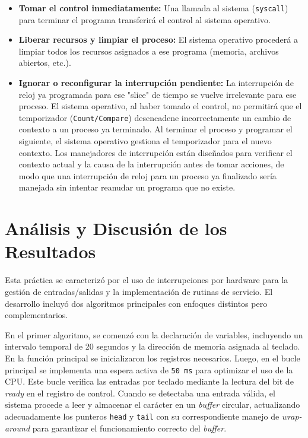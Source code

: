 \documentclass{article}
\begin{document}
\begin{itemize}
    \item \textbf{Tomar el control inmediatamente:} Una llamada al sistema (\texttt{syscall}) para terminar el programa transferirá el control al sistema operativo.
    
    \item \textbf{Liberar recursos y limpiar el proceso:} El sistema operativo procederá a limpiar todos los recursos asignados a ese programa (memoria, archivos abiertos, etc.).
    
    \item \textbf{Ignorar o reconfigurar la interrupción pendiente:} La interrupción de reloj ya programada para ese "slice" de tiempo se vuelve irrelevante para ese proceso. El sistema operativo, al haber tomado el control, no permitirá que el temporizador (\texttt{Count/Compare}) desencadene incorrectamente un cambio de contexto a un proceso ya terminado. Al terminar el proceso y programar el siguiente, el sistema operativo gestiona el temporizador para el nuevo contexto. Los manejadores de interrupción están diseñados para verificar el contexto actual y la causa de la interrupción antes de tomar acciones, de modo que una interrupción de reloj para un proceso ya finalizado sería manejada sin intentar reanudar un programa que no existe.
\end{itemize}

\section{Análisis y Discusión de los Resultados}

Esta práctica se caracterizó por el uso de interrupciones por hardware para la gestión de entradas/salidas y la implementación de rutinas de servicio. El desarrollo incluyó dos algoritmos principales con enfoques distintos pero complementarios.

En el primer algoritmo, se comenzó con la declaración de variables, incluyendo un intervalo temporal de 20 segundos y la dirección de memoria asignada al teclado. En la función principal se inicializaron los registros necesarios. Luego, en el bucle principal se implementa una espera activa de \texttt{50\,ms} para optimizar el uso de la CPU. Este bucle verifica las entradas por teclado mediante la lectura del bit de \textit{ready} en el registro de control. Cuando se detectaba una entrada válida, el sistema procede a leer y almacenar el carácter en un \textit{buffer} circular, actualizando adecuadamente los punteros \texttt{head} y \texttt{tail} con su correspondiente manejo de \textit{wrap-around} para garantizar el funcionamiento correcto del \textit{buffer}.
\end{document}
